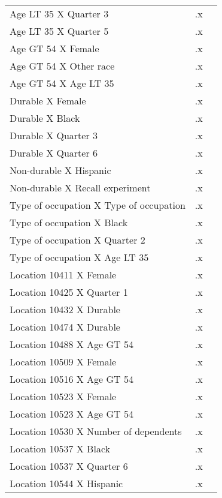 \begin{tabular}{l*{2}{c}}
Age LT 35 X Quarter 3&          .x&            \\
Age LT 35 X Quarter 5&          .x&            \\
Age GT 54 X Female  &          .x&            \\
Age GT 54 X Other race&          .x&            \\
Age GT 54 X Age LT 35&          .x&            \\
Durable X Female    &          .x&            \\
Durable X Black     &          .x&            \\
Durable X Quarter 3 &          .x&            \\
Durable X Quarter 6 &          .x&            \\
Non-durable X Hispanic&          .x&            \\
Non-durable X Recall experiment&          .x&            \\
Type of occupation X Type of occupation&          .x&            \\
Type of occupation X Black&          .x&            \\
Type of occupation X Quarter 2&          .x&            \\
Type of occupation X Age LT 35&          .x&            \\
Location 10411 X Female&          .x&            \\
Location 10425 X Quarter 1&          .x&            \\
Location 10432 X Durable&          .x&            \\
Location 10474 X Durable&          .x&            \\
Location 10488 X Age GT 54&          .x&            \\
Location 10509 X Female&          .x&            \\
Location 10516 X Age GT 54&          .x&            \\
Location 10523 X Female&          .x&            \\
Location 10523 X Age GT 54&          .x&            \\
Location 10530 X Number of dependents&          .x&            \\
Location 10537 X Black&          .x&            \\
Location 10537 X Quarter 6&          .x&            \\
Location 10544 X Hispanic&          .x&            \\

\end{tabular}
